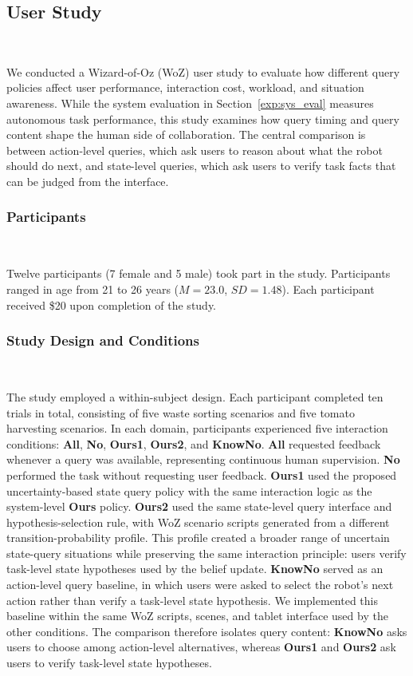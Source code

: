 \subsection{User Study}~\label{exp:user_study}

We conducted a Wizard-of-Oz (WoZ) user study to evaluate how different query policies affect user performance, interaction cost, workload, and situation awareness. While the system evaluation in Section~\ref{exp:sys_eval} measures autonomous task performance, this study examines how query timing and query content shape the human side of collaboration. The central comparison is between action-level queries, which ask users to reason about what the robot should do next, and state-level queries, which ask users to verify task facts that can be judged from the interface.

\subsubsection{Participants}~\label{user:participants}

Twelve participants (7 female and 5 male) took part in the study. Participants ranged in age from 21 to 26 years ($M=23.0$, $SD=1.48$). Each participant received \$20 upon completion of the study.

\subsubsection{Study Design and Conditions}~\label{user:design}

The study employed a within-subject design. Each participant completed ten trials in total, consisting of five waste sorting scenarios and five tomato harvesting scenarios. In each domain, participants experienced five interaction conditions: \textbf{All}, \textbf{No}, \textbf{Ours1}, \textbf{Ours2}, and \textbf{KnowNo}. \textbf{All} requested feedback whenever a query was available, representing continuous human supervision. \textbf{No} performed the task without requesting user feedback. \textbf{Ours1} used the proposed uncertainty-based state query policy with the same interaction logic as the system-level \textbf{Ours} policy. \textbf{Ours2} used the same state-level query interface and hypothesis-selection rule, with WoZ scenario scripts generated from a different transition-probability profile. This profile created a broader range of uncertain state-query situations while preserving the same interaction principle: users verify task-level state hypotheses used by the belief update. \textbf{KnowNo} served as an action-level query baseline, in which users were asked to select the robot's next action rather than verify a task-level state hypothesis. We implemented this baseline within the same WoZ scripts, scenes, and tablet interface used by the other conditions. The comparison therefore isolates query content: \textbf{KnowNo} asks users to choose among action-level alternatives, whereas \textbf{Ours1} and \textbf{Ours2} ask users to verify task-level state hypotheses.

